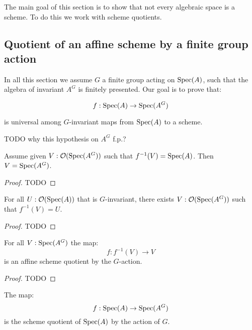 The main goal of this section is to show that not every algebraic space is a scheme. To do this we work with scheme quotients.

\subsection{Quotient of an affine scheme by a finite group action}

In all this section we assume $G$ a finite group acting on $\operatorname{Spec}(A)$, such that the algebra of invariant $A^G$ is finitely presented. Our goal is to prove that:

\[f:\operatorname{Spec}(A)\to \operatorname{Spec}(A^G)\] 

is universal among $G$-invariant maps from $\operatorname{Spec}(A)$ to a scheme.

\begin{remark}
TODO why this hypothesis on $A^G$ f.p.?
\end{remark}

\begin{lemma}\label{injective-on-open}
Assume given $V:\mathcal{O}(\operatorname{Spec}(A^G))$ such that $f^{-1}(V) = \operatorname{Spec}(A)$. Then $V=\operatorname{Spec}(A^G)$. 
\end{lemma}

\begin{proof}
TODO
\end{proof}

\begin{lemma}\label{surjective-on-open}
For all $U: \mathcal{O}(\operatorname{Spec}(A))$ that is $G$-invariant, there exists $V:\mathcal{O}(\operatorname{Spec}(A^G))$ such that $f^{-1}(V)=U$.
\end{lemma}

\begin{proof}
TODO
\end{proof}

\begin{lemma}\label{affine-scheme-quotient-on-open}
For all $V:\operatorname{Spec}(A^G)$ the map:
\[f : f^{-1}(V) \to V\]
is an affine scheme quotient by the $G$-action.
\end{lemma}

\begin{proof}
TODO
\end{proof}

\begin{proposition}
The map:
\[f:\operatorname{Spec}(A)\to \operatorname{Spec}(A^G)\] 
is the scheme quotient of $\operatorname{Spec}(A)$ by the action of $G$.
\end{proposition}


